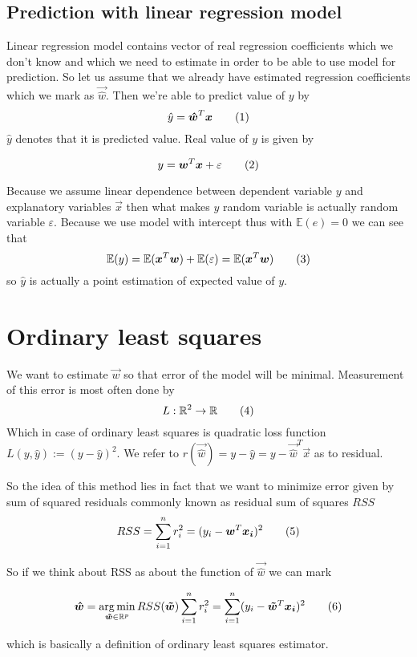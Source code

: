\subsection{Prediction with linear regression model}
Linear regression model contains vector of real regression coefficients which we don't know and which we need to estimate in order to be able to use model for prediction. So let us assume that we already have estimated regression coefficients which we mark as $\vec{\hat{w}}$. Then we're able to predict value of $y$ by
\[
    \hat{y} = \vec{\hat{w}}^T\vec{x} \numberthis
\]
$\hat{y}$ denotes that it is predicted value. Real value of $y$ is given by 

\[
    y = \vec{w}^T\vec{x} + \varepsilon \numberthis
\]

Because we assume linear dependence between dependent variable $y$ and explanatory variables $\vec{x}$ then what makes $y$ random variable is actually random variable $\varepsilon$. Because we use model with intercept thus with $\mathbb{E}(e) = 0$ we can see that 
\[
\mathbb{E}(y) =\mathbb{E}(\vec{x}^T\vec{w}) + \mathbb{E}(\varepsilon) = \mathbb{E}(\vec{x}^T\vec{w})
\numberthis
\]
so $\hat{y}$ is actually a point estimation of expected value of $y$.


\section{Ordinary least squares}
We want to estimate $\vec{w}$ so that error of the model will be minimal. Measurement of this error is most often done by  
\[ 
L : \mathbb{R}^2 \rightarrow  \mathbb{R} \numberthis
\]
Which in case of ordinary least squares is quadratic loss function $L(y, \hat{y}) := (y - \hat{y})^2$. We refer to $r(\vec{\hat{w}}) = y - \hat{y} = y - \vec{\hat{w}}^T\vec{x} $ as to residual. 

So the idea of this method lies in fact that we want to minimize error given by sum of squared residuals commonly known as residual sum of squares $RSS$
\[
    RSS = \sum\limits_{i=1}^n r_i^2 = (y_i - \vec{w}^T\vec{x_i})^2 \numberthis
\]

So if we think about RSS as about the function of $\vec{\hat{w}}$ we can mark

\[
    \vec{\hat{w}} = \argmin_{\vec{\tilde{w}} \in \mathbb{R}^p} RSS(\vec{\tilde{w}}) \sum\limits_{i=1}^n r_i^2 = 
    \sum\limits_{i=1}^n (y_i - \vec{\tilde{w}}^T\vec{x_i})^2 \numberthis
\]

which is basically a definition of ordinary least squares estimator.

